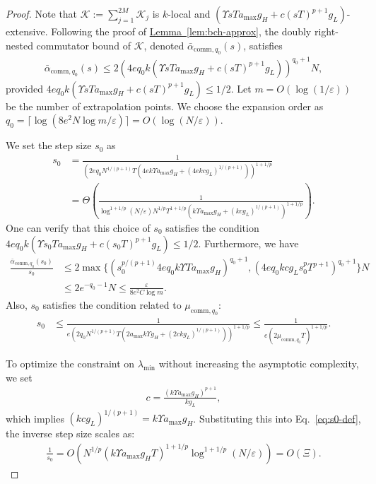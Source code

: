 \documentclass[aps,pra,reprint,groupedaddress,floatfix]{revtex4-2}
\newcommand{\lem}[1]{\hyperref[lem:#1]{Lemma~\ref*{lem:#1}}}
\newcommand{\eps}{\varepsilon}
\newcommand{\mc}{\mathcal}
\begin{document}
\begin{proof}
    Note that $\mc K:= \sum_{j=1}^{2M} {\mc K}_j$ is $k$-local and $(\Upsilon sT a_{\max}g_H+c(sT)^{p+1} g_L)$-extensive.
    Following the proof of \lem{bch-approx}, the doubly right-nested commutator bound of $\mc K$, denoted $\bar{\alpha}_{\mathrm{comm}, q_0}(s)$, satisfies 
    \begin{align*}
        \bar{\alpha}_{\mathrm{comm}, q_0}(s) \le 2(4eq_0 k(\Upsilon sT a_{\max}g_H+c(sT)^{p+1} g_L))^{q_0+1}N,
    \end{align*}
    provided $4eq_0 k(\Upsilon sT a_{\max}g_H+c(sT)^{p+1} g_L) \le 1/2$. 
    Let $m=O(\log(1/\eps))$ be the number of extrapolation points. We choose the expansion order as $q_0 = \lceil \log(8e^2N\log m/\eps) \rceil = O(\log(N/\eps))$. 
    
    We set the step size $s_0$ as
    \begin{align}
    \label{eq:s0-def}
        s_0 &= \frac{1}{(2eq_0 N^{1/(p+1)}T (4ek \Upsilon a_{\max} g_H + (4ekcg_L )^{1/(p+1)}))^{1+1/p}} \\
        & = \Theta\left( \frac{1}{ \log^{1+1/p}(N/\eps)  N^{1/p}T^{1+1/p}(k\Upsilon a_{\max} g_H +(kcg_L)^{1/(p+1)})^{1+1/p} } \right).\nonumber
    \end{align}
    One can verify that this choice of $s_0$ satisfies the condition $4eq_0 k(\Upsilon s_0T a_{\max}g_H+c(s_0T)^{p+1} g_L) \le 1/2$.
    Furthermore, we have
    \begin{align*}
         \frac{\bar{\alpha}_{\mathrm{comm}, q_0}(s_0)}{s_0} & \le 2\max\{(s_0^{p/(p+1)}4eq_0k\Upsilon T a_{\max} g_H)^{q_0+1}, (4eq_0kcg_L s_0 ^pT^{p+1})^{q_0+1}\}N \\
         &\le 2e^{-q_0-1}N \le \frac{\eps}{8e^2C \log m}.
    \end{align*}
    Also, $s_0$ satisfies the condition related to $\mu_{\mathrm{comm}, q_0}$:
    \begin{align*}
        s_0 &\le \frac{1}{e(2q_0 N^{1/(p+1)} T(2 a_{\max} k\Upsilon g_H + (2ckg_L)^{1/(p+1)}))^{1+1/p}} \le \frac{1}{e(2\mu_{\mathrm{comm}, q_0}T)^{1+1/p}}. 
    \end{align*}
    
    To optimize the constraint on $\lambda_{\min}$ without increasing the asymptotic complexity, we set
    \begin{align}
    \label{eq:def-c}
        c = \frac{(k\Upsilon a_{\max}g_H)^{p+1}}{kg_L},
    \end{align}
    which implies $(kcg_L)^{1/(p+1)} = k\Upsilon a_{\max}g_H$. Substituting this into Eq.~\eqref{eq:s0-def}, the inverse step size scales as:
    \begin{align*}
        \frac{1}{s_0} = O\left( N^{1/p}(k\Upsilon a_{\max} g_H T)^{1+1/p} \log^{1+1/p}(N/\eps) \right) = O(\Xi).
    \end{align*}


\end{proof}
\end{document}
